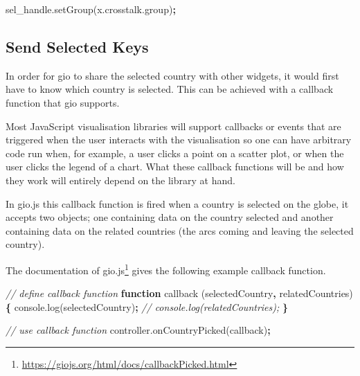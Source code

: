 \documentclass[
  10pt,
]{krantz}
\makeatletter
\newenvironment{Shaded}{\begin{snugshade}}{\end{snugshade}}
\newcommand{\AttributeTok}[1]{\textcolor[rgb]{0.61,0.61,0.61}{#1}}
\newcommand{\CommentTok}[1]{\textcolor[rgb]{0.37,0.37,0.37}{\textit{#1}}}
\newcommand{\KeywordTok}[1]{\textcolor[rgb]{0.27,0.27,0.27}{\textbf{#1}}}
\newcommand{\NormalTok}[1]{#1}
\newcommand{\OperatorTok}[1]{\textcolor[rgb]{0.43,0.43,0.43}{\textbf{#1}}}
\newcommand{\VariableTok}[1]{\textcolor[rgb]{0,0,0}{#1}}
\renewcommand{\href}[2]{#2\footnote{\url{#1}}}
\newenvironment{kframe}{%
\medskip{}
\setlength{\fboxsep}{.8em}
 \def\at@end@of@kframe{}%
 \ifinner\ifhmode%
  \def\at@end@of@kframe{\end{minipage}}%
  \begin{minipage}{\columnwidth}%
 \fi\fi%
 \def\FrameCommand##1{\hskip\@totalleftmargin \hskip-\fboxsep
 \colorbox{shadecolor}{##1}\hskip-\fboxsep
     \hskip-\linewidth \hskip-\@totalleftmargin \hskip\columnwidth}%
 \MakeFramed {\advance\hsize-\width
   \@totalleftmargin\z@ \linewidth\hsize
   \@setminipage}}%
 {\par\unskip\endMakeFramed%
 \at@end@of@kframe}
\renewenvironment{Shaded}{\begin{kframe}}{\end{kframe}}
\makeatother
\begin{document}
\begin{Shaded}
\begin{Highlighting}[]
\VariableTok{sel\_handle}\NormalTok{.}\AttributeTok{setGroup}\NormalTok{(}\VariableTok{x}\NormalTok{.}\VariableTok{crosstalk}\NormalTok{.}\AttributeTok{group}\NormalTok{)}\OperatorTok{;}
\end{Highlighting}
\end{Shaded}

\hypertarget{linking-widgets-send-keys}{%
\subsection{Send Selected Keys}\label{linking-widgets-send-keys}}

In order for gio to share the selected country with other widgets, it would first have to know which country is selected. This can be achieved with a callback function that gio supports.

Most JavaScript visualisation libraries will support callbacks or events that are triggered when the user interacts with the visualisation so one can have arbitrary code run when, for example, a user clicks a point on a scatter plot, or when the user clicks the legend of a chart. What these callback functions will be and how they work will entirely depend on the library at hand.

In gio.js this callback function is fired when a country is selected on the globe, it accepts two objects; one containing data on the country selected and another containing data on the related countries (the arcs coming and leaving the selected country).

The \href{https://giojs.org/html/docs/callbackPicked.html}{documentation of gio.js} gives the following example callback function.

\begin{Shaded}
\begin{Highlighting}[]
\CommentTok{// define callback function}
\KeywordTok{function} \AttributeTok{callback}\NormalTok{ (selectedCountry}\OperatorTok{,}\NormalTok{ relatedCountries) }\OperatorTok{\{}
  \VariableTok{console}\NormalTok{.}\AttributeTok{log}\NormalTok{(selectedCountry)}\OperatorTok{;}
  \CommentTok{// console.log(relatedCountries);}
\OperatorTok{\}}

\CommentTok{// use callback function}
\VariableTok{controller}\NormalTok{.}\AttributeTok{onCountryPicked}\NormalTok{(callback)}\OperatorTok{;}
\end{Highlighting}
\end{Shaded}
\end{document}
